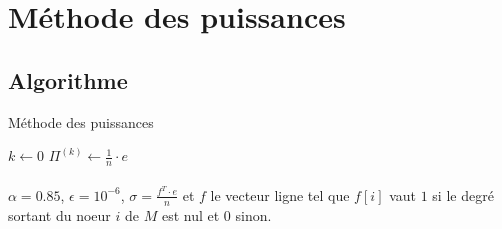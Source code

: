 \section{Méthode des puissances}
	
	\subsection{Algorithme}
	
		\begin{adjustwidth}{1.5cm}{1.5cm} 
		\begin{algorithm}[H]
			\caption{Méthode des puissances}
			$k \gets 0$ 
			$\Pi^{(k)} \gets \frac{1}{n} \cdot e$\; 
		\end{algorithm}
		\end{adjustwidth}
		
		\paragraph{}$\alpha = 0.85$, $\epsilon = 10^{-6}$,  $\sigma = \frac{f^{T} \cdot e}{n}$ et $f$ le vecteur ligne tel que $f[i]$ vaut $1$ si le degré sortant du noeur $i$ de $M$ est nul et $0$ sinon.

